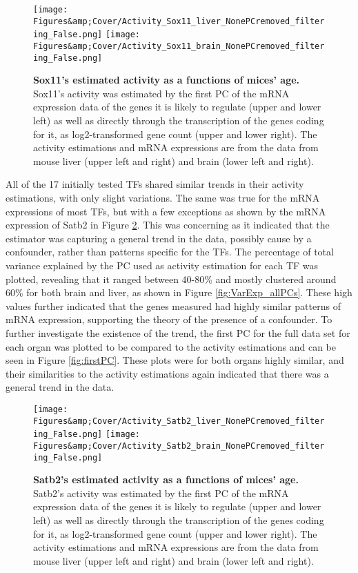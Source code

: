 \begin{figure}
    \centering
    \texttt{[image: Figures\&amp;Cover/Activity\_Sox11\_liver\_NonePCremoved\_filtering\_False.png]}
    \texttt{[image: Figures\&amp;Cover/Activity\_Sox11\_brain\_NonePCremoved\_filtering\_False.png]}
    \caption{\textbf{Sox11's estimated activity as a functions of mices' age.} Sox11's activity was estimated by the first \ac{PC} of the mRNA expression data of the genes it is likely to regulate (upper and lower left) as well as directly through the transcription of the genes coding for it, as log2-transformed gene count (upper and lower right). The activity estimations and mRNA expressions are from the data from mouse liver (upper left and right) and brain (lower left and right).}
    \label{fig:est_allPCs_Sox11}
\end{figure}

All of the 17 initially tested \acp{TF} shared similar trends in their activity estimations, with only slight variations. The same was true for the mRNA expressions of most \acp{TF}, but with a few exceptions as shown by the mRNA expression of Satb2 in Figure \ref{fig:est_allPCs_Satb2}. This was concerning as it indicated that the estimator was capturing a general trend in the data, possibly cause by a confounder, rather than patterns specific for the \acp{TF}. The percentage of total variance explained by the \ac{PC} used as activity estimation for each \ac{TF} was plotted, revealing that it ranged between 40-80\% and mostly clustered around 60\% for both brain and liver, as shown in Figure \ref{fig:VarExp_allPCs}. These high values further indicated that the genes measured had highly similar patterns of mRNA expression, supporting the theory of the presence of a confounder. To further investigate the existence of the trend, the first \ac{PC} for the full data set for each organ was plotted to be compared to the activity estimations and can be seen in Figure \ref{fig:firstPC}. These plots were for both organs highly similar, and their similarities to the activity estimations again indicated that there was a general trend in the data.

\begin{figure}
    \centering
    \texttt{[image: Figures\&amp;Cover/Activity\_Satb2\_liver\_NonePCremoved\_filtering\_False.png]}
    \texttt{[image: Figures\&amp;Cover/Activity\_Satb2\_brain\_NonePCremoved\_filtering\_False.png]}
    \caption{\textbf{Satb2's estimated activity as a functions of mices' age.} Satb2's activity was estimated by the first \ac{PC} of the mRNA expression data of the genes it is likely to regulate (upper and lower left) as well as directly through the transcription of the genes coding for it, as log2-transformed gene count (upper and lower right). The activity estimations and mRNA expressions are from the data from mouse liver (upper left and right) and brain (lower left and right).}
    \label{fig:est_allPCs_Satb2}
\end{figure}

